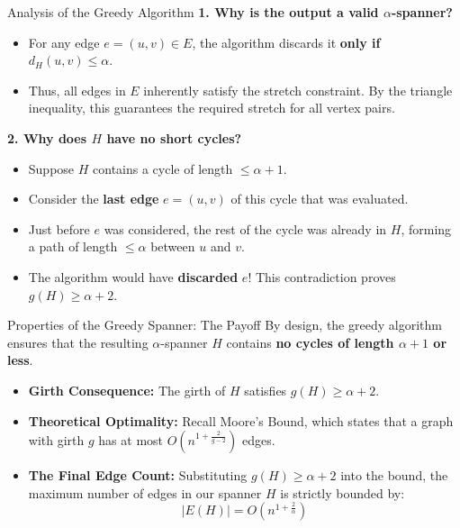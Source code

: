 \documentclass{beamer}
\begin{document}
\begin{frame}{Analysis of the Greedy Algorithm}
    \textbf{1. Why is the output a valid $\alpha$-spanner?}
    \begin{itemize}
        \item For any edge $e=(u,v) \in E$, the algorithm discards it \textbf{only if} $d_H(u,v) \le \alpha$. 
        \item Thus, all edges in $E$ inherently satisfy the stretch constraint. By the triangle inequality, this guarantees the required stretch for all vertex pairs.
    \end{itemize}
    
    \vspace{0.4cm}
    \textbf{2. Why does $H$ have no short cycles?}
    \begin{itemize}
        \item Suppose $H$ contains a cycle of length $\le \alpha + 1$. 
        \item Consider the \textbf{last edge} $e=(u,v)$ of this cycle that was evaluated.
        \item Just before $e$ was considered, the rest of the cycle was already in $H$, forming a path of length $\le \alpha$ between $u$ and $v$.
        \item The algorithm would have \textbf{discarded} $e$! This contradiction proves $g(H) \ge \alpha + 2$.
    \end{itemize}
\end{frame}

\begin{frame}{Properties of the Greedy Spanner: The Payoff}
    By design, the greedy algorithm ensures that the resulting $\alpha$-spanner $H$ contains \textbf{no cycles of length $\alpha + 1$ or less}.
    
    \vspace{0.4cm}
    \begin{itemize}
        \item \textbf{Girth Consequence:} The girth of $H$ satisfies $g(H) \ge \alpha + 2$.
        
        \vspace{0.3cm}
        \item \textbf{Theoretical Optimality:} Recall Moore's Bound, which states that a graph with girth $g$ has at most $O\left(n^{1 + \frac{2}{g-2}}\right)$ edges.
        
        \vspace{0.3cm}
        \item \textbf{The Final Edge Count:} Substituting $g(H) \ge \alpha + 2$ into the bound, the maximum number of edges in our spanner $H$ is strictly bounded by:
        \[ |E(H)| = O\left(n^{1 + \frac{2}{\alpha}}\right) \]
    \end{itemize}
\end{frame}
\end{document}
